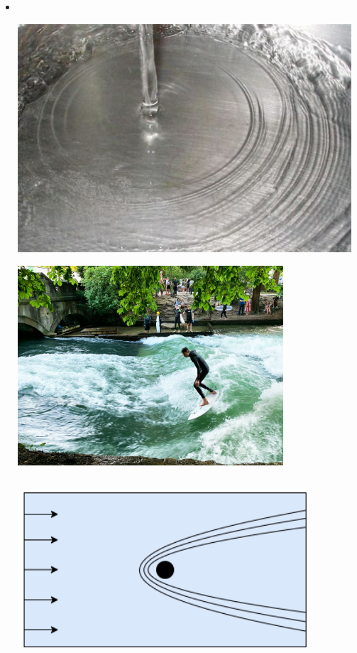 \begin{frame}
\begin{minipage}{0.45\textwidth}
\begin{itemize}
\end{itemize}
\end{minipage}
\begin{minipage}{0.4\textwidth}
\centering
\begin{itemize}
\item<2->[]
\centering
{}\\[0.5cm]
\hspace{0.25cm}
\begin{minipage}{0.4\textwidth}
\includegraphics[width=0.98\textwidth]{Resources/Images/faucet.jpeg}
\end{minipage}
\begin{minipage}{0.45\textwidth}
\includegraphics[width=0.78\textwidth]{Resources/Images/eisbach.jpg}
\end{minipage}\\[0.4cm]
\includegraphics[width=0.85\textwidth]{Resources/Images/supercritical.png}

\end{itemize}
\end{minipage}
\end{frame}

